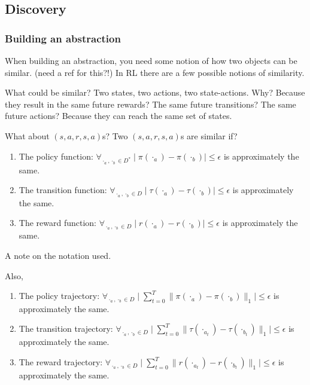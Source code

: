 \subsection{Discovery}


\subsubsection{Building an abstraction}

When building an abstraction, you need some notion of how two objects can be similar. (need a ref for this?!)
In RL there are a few possible notions of similarity.

What could be similar? Two states, two actions, two state-actions. Why?
Because they result in the same future rewards? The same future transitions? The same future actions?
Because they can reach the same set of states.


What about $(s, a, r, s, a)$s? Two $(s, a, r, s, a)$s are similar if?

\begin{enumerate}
\tightlist
\item
  The policy function:
  \(\forall_{\cdot_a, \cdot_b \in D^{* }} \mid \pi(\cdot_a) - \pi(\cdot_b) \mid \le \epsilon\)
  is approximately the same.
\item
  The transition function:
  \(\forall_{\cdot_a, \cdot_b \in D} \mid \tau(\cdot_a) - \tau(\cdot_b)\mid \le \epsilon\)
  is approximately the same.
\item
  The reward function:
  \(\forall_{\cdot_a, \cdot_b \in D} \mid r(\cdot_a) - r(\cdot_b) \mid \le \epsilon\)
  is approximately the same.
\end{enumerate}

A note on the notation used.

Also,

\begin{enumerate}
\def\labelenumi{\arabic{enumi}.}
\setcounter{enumi}{3}
\tightlist
\item
  The policy trajectory:
  \(\forall_{\cdot_a, \cdot_b \in D} \mid \sum_{t=0}^T \parallel \pi(\cdot_a) - \pi(\cdot_b)\parallel_1 \mid \le \epsilon\)
  is approximately the same.
\item
  The transition trajectory:
  \(\forall_{\cdot_a, \cdot_b \in D} \mid \sum_{t=0}^T\parallel \tau(\cdot_{a_t}) - \tau(\cdot_{b_t})\parallel_1\mid \le \epsilon\)
  is approximately the same.
\item
  The reward trajectory:
  \(\forall_{\cdot_a, \cdot_b \in D} \mid \sum_{t=0}^T \parallel r(\cdot_{a_t}) - r(\cdot_{b_t})\parallel_1 \mid \le \epsilon\)
  is approximately the same.
\end{enumerate}

